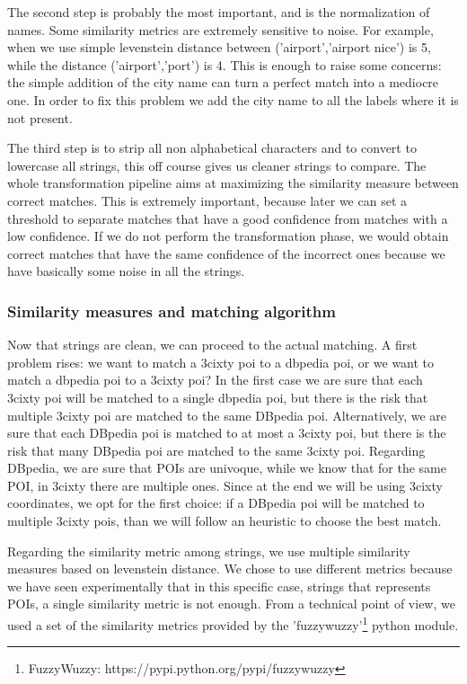 \documentclass[paper=a4, fontsize=11pt]{scrartcl}
\begin{document}
The second step is probably the most important, and is the normalization of names. Some similarity metrics are extremely sensitive to noise. For example, when we use simple levenstein distance between ('airport','airport nice') is 5, while the distance ('airport','port') is 4. This is enough to raise some concerns: the simple addition of the city name can turn a perfect match into a mediocre one. In order to fix this problem we add the city name to all the labels where it is not present.

The third step is to strip all non alphabetical characters and to convert to lowercase all strings, this off course gives us cleaner strings to compare.
The whole transformation pipeline aims at maximizing the similarity measure between correct matches. This is extremely important, because later we can set a threshold to separate matches that have a good confidence from matches with a low confidence. If we do not perform the transformation phase, we would obtain correct matches that have the same confidence of the incorrect ones because we have basically some noise in all the strings.

\subsubsection{Similarity measures and matching algorithm}
Now that strings are clean, we can proceed to the actual matching. A first problem rises: we want to match a 3cixty poi to a dbpedia poi, or we want to match a dbpedia poi to a 3cixty poi? In the first case we are sure that each 3cixty poi will be matched to a single dbpedia poi, but there is the risk that multiple 3cixty poi are matched to the same DBpedia poi. Alternatively, we are sure that each DBpedia poi is matched to at most a 3cixty poi, but there is the risk that many DBpedia poi are matched to the same 3cixty poi.
Regarding DBpedia, we are sure that POIs are univoque, while we know that for the same POI, in 3cixty there are multiple ones.
Since at the end we will be using 3cixty coordinates, we opt for the first choice: if a DBpedia poi will be matched to multiple 3cixty pois, than we will follow an heuristic to choose the best match.

Regarding the similarity metric among strings, we use multiple similarity measures based on levenstein distance. We chose to use different metrics because we have seen experimentally that in this specific case, strings that represents POIs, a single similarity metric is not enough. From a technical point of view, we used a set of the similarity metrics provided by the 'fuzzywuzzy'\footnote{FuzzyWuzzy: https://pypi.python.org/pypi/fuzzywuzzy} python module.
\end{document}

